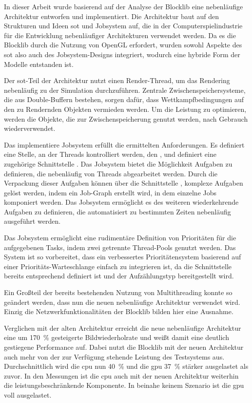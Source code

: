 In dieser Arbeit wurde basierend auf der Analyse der Blocklib eine nebenläufige Architektur entworfen und implementiert. Die Architektur baut auf den Strukturen und Ideen \acf{sot} und Jobsystem auf, die in der Computerspielindustrie für die Entwicklung nebenläufiger Architekturen verwendet werden. Da es die Blocklib durch die Nutzung von OpenGL erfordert, wurden sowohl Aspekte des \ac{sot} also auch des Jobsystem-Designs integriert, wodurch eine hybride Form der Modelle entstanden ist.

Der \ac{sot}-Teil der Architektur nutzt einen Render-Thread, um das Rendering nebenläufig zu der Simulation durchzuführen. Zentrale Zwischenspeichersysteme, die aus Double-Buffern bestehen, sorgen dafür, dass Wettkampfbedingungen auf den zu Rendernden Objekten vermieden werden. Um die Leistung zu optimieren, werden die Objekte, die zur Zwischenspeicherung genutzt werden, nach Gebrauch wiederverwendet.

Das implementiere Jobsystem erfüllt die ermittelten Anforderungen. Es definiert eine Stelle, an der Threads kontrolliert werden, den , und definiert eine zugehörige Schnittstelle . Das Jobsystem bietet die Möglichkeit Aufgaben zu definieren, die nebenläufig von Threads abgearbeitet werden. Durch die Verpackung dieser Aufgaben können über die Schnittstelle , komplexe Aufgaben gelöst werden, indem ein Job-Graph erstellt wird, in dem einzelne Jobs komponiert werden. Das Jobsystem ermöglicht es des weiteren wiederkehrende Aufgaben zu definieren, die automatisiert zu bestimmten Zeiten nebenläufig ausgeführt werden.

Das Jobsystem ermöglicht eine rudimentäre Definition von Prioritäten für die aufgegebenen Tasks, indem zwei getrennte Thread-Pools genutzt werden. Das System ist so vorbereitet, dass ein verbessertes Prioritätensystem basierend auf einer Prioritäts-Warteschlange einfach zu integrieren ist, da die Schnittstelle  bereits entsprechend definiert ist und der Aufzählungstyp  bereitgestellt wird.

Ein Großteil der bereits bestehenden Nutzung von Multithreading konnte so geändert werden, dass nun die neuen nebenläufige Architektur verwendet wird. Einzig die Netzwerkfunktionalitäten der Blocklib bilden hier eine Ausnahme.

Verglichen mit der alten Architektur erreicht die neue nebenläufige Architektur eine um \SI{170}{\percent} gesteigerte Bildwiederholrate und weißt damit eine deutlich gestiegene Performance auf. Dabei nutzt die Blocklib mit der neuen Architektur auch mehr von der zur Verfügung stehende Leistung des Testsystems aus. Durchschnittlich wird die \ac{cpu} nun \SI{40}{\percent} und die \ac{gpu} \SI{37}{\percent} stärker ausgelastet als zuvor. In den Messungen ist die \ac{cpu} auch mit der neuen Architektur weiterhin die leistungsbeschränkende Komponente. In beinahe keinem Szenario ist die \ac{gpu} voll ausgelastet.